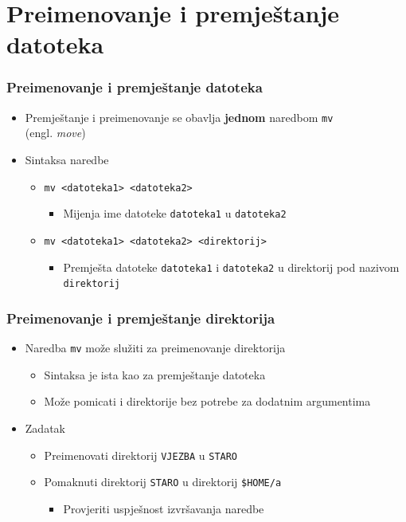 \documentclass{beamer}
\begin{document}
\section{Preimenovanje i premještanje datoteka}
\begin{frame}[t]
\frametitle{Preimenovanje i premještanje datoteka}
\begin{itemize}
  \item Premještanje i preimenovanje se obavlja \textbf{jednom} naredbom
        \texttt{mv} \\(engl. \emph{move})
  \item Sintaksa naredbe 
  \begin{itemize}
    \item[] \texttt{mv \textless datoteka1\textgreater
                       \textless datoteka2\textgreater}
    \begin{itemize}
      \item Mijenja ime datoteke \texttt{datoteka1} u \texttt{datoteka2}
    \end{itemize}
    \item[] \texttt{mv \textless datoteka1\textgreater 
                       \textless datoteka2\textgreater 
                       \textless direktorij\textgreater}
    \begin{itemize}
      \item Premješta datoteke \texttt{datoteka1} i \texttt{datoteka2}
               u direktorij pod nazivom \texttt{direktorij}
    \end{itemize}
  \end{itemize}
\end{itemize}
\end{frame}

\begin{frame}[t]
\frametitle{Preimenovanje i premještanje direktorija}
\begin{itemize}
  \item Naredba \texttt{mv} može služiti za preimenovanje direktorija 
  \begin{itemize}
    \item Sintaksa je ista kao za premještanje datoteka
    \item Može pomicati i direktorije bez potrebe za dodatnim argumentima
  \end{itemize}
  \item Zadatak
  \begin{itemize}
    \item Preimenovati direktorij \texttt{VJEZBA} u \texttt{STARO}
    \item Pomaknuti direktorij \texttt{STARO} u direktorij 
          \texttt{\$HOME/a}
    \begin{itemize}
      \item Provjeriti uspješnost izvršavanja naredbe
    \end{itemize}
  \end{itemize}
\end{itemize}
\end{frame}
\end{document}
